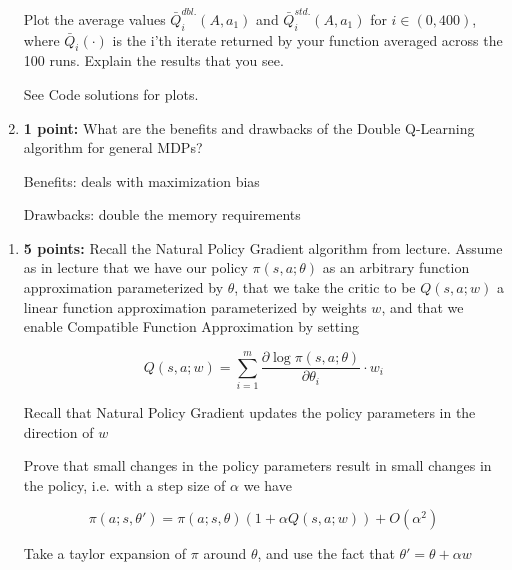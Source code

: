 \documentclass[12pt]{exam}
\begin{document}
\begin{questions}
\begin{enumerate}
Plot the average values  $\bar{Q}_i^{dbl.}(A, a_1)$ and $\bar{Q}_i^{std.}(A, a_1)$ for $i \in (0, 400)$, where $\bar{Q}_i(\cdot)$ is the i'th iterate returned by your function averaged across the 100 runs. Explain the results that you see.


\begin{solution}
See Code solutions for plots.
\end{solution}

\item {\bf 1 point: } What are the benefits and drawbacks of the Double Q-Learning algorithm for general MDPs? 


\begin{solution}
Benefits: deals with maximization bias

Drawbacks: double the memory requirements
\end{solution}




\end{enumerate}
\newpage

\begin{enumerate}


\item {\bf 5 points: } Recall the Natural Policy Gradient algorithm from lecture. Assume as in lecture that we have our policy $\pi(s,a;\theta)$ as an arbitrary function approximation parameterized by $\theta$, that we take the critic to be $Q(s,a;w)$ a linear function approximation parameterized by weights $w$, and that we enable Compatible Function Approximation by setting 

$$Q(s,a;w) = \sum_{i=1}^m \frac{\partial \log \pi(s,a;\theta)}{\partial \theta_i} \cdot w_i$$

Recall that Natural Policy Gradient updates the policy parameters in the direction of $w$

Prove that small changes in the policy parameters result in small changes in the policy, i.e. with a step size of $\alpha$ we have

$$\pi(a; s, \theta') = \pi(a; s, \theta)(1 + \alpha Q(s,a;w)) + O(\alpha^2)$$

\begin{solution}

Take a taylor expansion of $\pi$ around $\theta$, and use the fact that $\theta' = \theta + \alpha w$


\end{solution}
\end{enumerate}
\end{questions}
\end{document}
